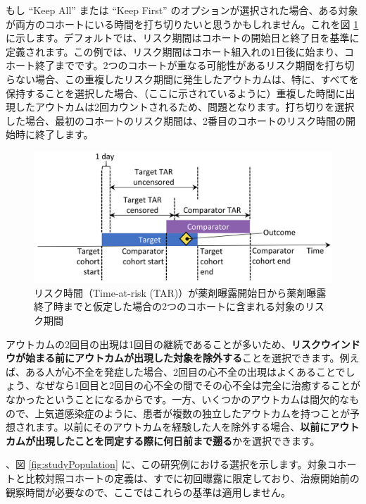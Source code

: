 \documentclass[
  11pt]{book}
\theoremstyle{definition}
\theoremstyle{definition}
\theoremstyle{definition}
\theoremstyle{definition}
\theoremstyle{remark}
\begin{document}
もし ``Keep All'' または ``Keep First'' のオプションが選択された場合、ある対象が両方のコホートにいる時間を打ち切りたいと思うかもしれません。これを図 \ref{fig:tar} に示します。デフォルトでは、リスク期間はコホートの開始日と終了日を基準に定義されます。この例では、リスク期間はコホート組入れの1日後に始まり、コホート終了までです。2つのコホートが重なる可能性があるリスク期間を打ち切らない場合、この重複したリスク期間に発生したアウトカムは、特に、すべてを保持することを選択した場合、（ここに示されているように）重複した時間に出現したアウトカムは2回カウントされるため、問題となります。打ち切りを選択した場合、最初のコホートのリスク期間は、2番目のコホートのリスク時間の開始時に終了します。

\begin{figure}

{\centering \includegraphics[width=0.9\linewidth]{images/PopulationLevelEstimation/tar} 

}

\caption{リスク時間（Time-at-risk (TAR)）が薬剤曝露開始日から薬剤曝露終了時までと仮定した場合の2つのコホートに含まれる対象のリスク期間}\label{fig:tar}
\end{figure}

アウトカムの2回目の出現は1回目の継続であることが多いため、\textbf{リスクウインドウが始まる前にアウトカムが出現した対象を除外する}ことを選択できます。例えば、ある人が心不全を発症した場合、2回目の心不全の出現はよくあることでしょう、なぜなら1回目と2回目の心不全の間でその心不全は完全に治癒することがなかったということになるからです。一方、いくつかのアウトカムは間欠的なもので、上気道感染症のように、患者が複数の独立したアウトカムを持つことが予想されます。以前にそのアウトカムを経験した人を除外する場合、\textbf{以前にアウトカムが出現したことを同定する際に何日前まで遡る}かを選択できます。

、図 \ref{fig:studyPopulation} に、この研究例における選択を示します。対象コホートと比較対照コホートの定義は、すでに初回曝露に限定しており、治療開始前の観察時間が必要なので、ここではこれらの基準は適用しません。
\end{document}
